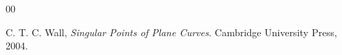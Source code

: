 \documentclass[12pt]{amsart}
\theoremstyle{plain}
\theoremstyle{definition}
\numberwithin{equation}{section}
\newcommand{\C}{\mathbb{C}}
\newcommand{\PP}{\mathbb{P}}
\begin{document}
\begin{thebibliography}{00}






 C. T. C. Wall, \textit{Singular Points of Plane Curves}. Cambridge University
Press, 2004.




\end{thebibliography} 
\end{document}
